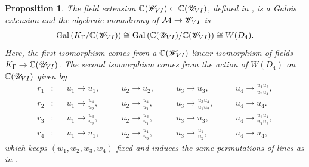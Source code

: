 \documentclass[10pt,a4paper]{amsart}
\newtheorem{proposition}{Proposition}
\newcommand{\C}{\mathbb{C}}
\begin{document}
\begin{proposition}\label{prop:algebraicmonodromyPVI} 
    The field extension $\C(\mathscr{W}_{\rm{VI}})\subset \C(\mathscr{U}_{\rm{VI}})$, defined in , is a Galois extension and the algebraic monodromy of $\mathcal{M}\to\mathscr{W}_{\rm{VI}}$ is 
    \begin{equation*}
\operatorname{Gal}\left( K_{\Gamma}/\C (\mathscr{W}_{\rm{VI}})\right)\cong \operatorname{Gal}\left(\C(\mathscr{U}_{\rm{VI}})/\C(\mathscr{W}_{\rm{VI}})\right)\cong W(D_4).
    \end{equation*}
    Here, the first isomorphism comes from a $\C(\mathscr{W}_{\rm{VI}})$-linear isomorphism of fields 
    $K_{\Gamma} \to \C(\mathscr{U}_{\rm{VI}})$. 
    The second isomorphism comes from the action of $W(D_4)$ on $\C(\mathscr{U}_{\rm{VI}})$ given by 
    \begin{equation} \label{pvi:actionofD4onU}
\begin{aligned}
    r_1 &: &&u_1\to u_1, \quad 
    &&u_2\to u_2, \quad 
    &&u_3\to u_3, \quad 
    &&u_4 \to \frac{u_1 u_2}{u_3 u_4}, \\
    r_2 &: &&u_1\to \frac{u_4}{u_2}, \quad 
    &&u_2\to \frac{u_4}{u_1}, \quad 
    &&u_3\to \frac{u_3 u_4}{u_1 u_2}, \quad 
    &&u_4\to u_4. \\
    r_3 &: &&u_1\to \frac{u_3}{u_2}, \quad 
    &&u_2\to \frac{u_3}{u_1}, \quad 
    &&u_3 \to u_3, \quad 
    &&u_4\to \frac{u_3 u_4}{u_1 u_2}, \\
    r_4 &: &&u_1 \to u_1, \quad 
    &&u_2\to \frac{u_1}{u_3}, \quad 
    &&u_3\to \frac{u_1}{u_2}, \quad
    &&u_4 \to u_4,
\end{aligned}
\end{equation}
which keeps $(w_1,w_2,w_3,w_4)$ fixed and induces the same permutations of lines as in .
\end{proposition}
\end{document}
